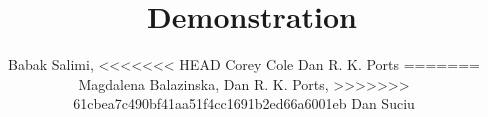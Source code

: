 
\title{\GSQL \ Demonstration}


\author{
    Babak Salimi,
<<<<<<< HEAD
    Corey Cole
    Dan R. K. Ports
=======
    Magdalena Balazinska,
    Dan R. K. Ports,
>>>>>>> 61cbea7c490bf41aa51f4cc1691b2ed66a6001eb
    Dan Suciu
}


